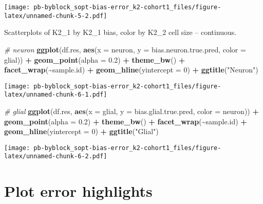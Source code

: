 \documentclass[
]{article}
\newenvironment{Shaded}{\begin{snugshade}}{\end{snugshade}}
\newcommand{\AttributeTok}[1]{\textcolor[rgb]{0.13,0.29,0.53}{#1}}
\newcommand{\CommentTok}[1]{\textcolor[rgb]{0.56,0.35,0.01}{\textit{#1}}}
\newcommand{\DecValTok}[1]{\textcolor[rgb]{0.00,0.00,0.81}{#1}}
\newcommand{\FloatTok}[1]{\textcolor[rgb]{0.00,0.00,0.81}{#1}}
\newcommand{\FunctionTok}[1]{\textcolor[rgb]{0.13,0.29,0.53}{\textbf{#1}}}
\newcommand{\NormalTok}[1]{#1}
\newcommand{\SpecialCharTok}[1]{\textcolor[rgb]{0.81,0.36,0.00}{\textbf{#1}}}
\newcommand{\StringTok}[1]{\textcolor[rgb]{0.31,0.60,0.02}{#1}}
\begin{document}
\texttt{[image: pb-byblock\_sopt-bias-error\_k2-cohort1\_files/figure-latex/unnamed-chunk-5-2.pdf]}

Scatterplots of K2\_1 by K2\_1 bias, color by K2\_2 cell size --
continuous.

\begin{Shaded}
\begin{Highlighting}[]
\CommentTok{\# neuron}
\FunctionTok{ggplot}\NormalTok{(df.res, }\FunctionTok{aes}\NormalTok{(}\AttributeTok{x =}\NormalTok{ neuron, }\AttributeTok{y =}\NormalTok{ bias.neuron.true.pred, }\AttributeTok{color =}\NormalTok{ glial)) }\SpecialCharTok{+} 
  \FunctionTok{geom\_point}\NormalTok{(}\AttributeTok{alpha =} \FloatTok{0.2}\NormalTok{) }\SpecialCharTok{+} \FunctionTok{theme\_bw}\NormalTok{() }\SpecialCharTok{+} \FunctionTok{facet\_wrap}\NormalTok{(}\SpecialCharTok{\textasciitilde{}}\NormalTok{sample.id) }\SpecialCharTok{+} \FunctionTok{geom\_hline}\NormalTok{(}\AttributeTok{yintercept =} \DecValTok{0}\NormalTok{) }\SpecialCharTok{+}
  \FunctionTok{ggtitle}\NormalTok{(}\StringTok{"Neuron"}\NormalTok{)}
\end{Highlighting}
\end{Shaded}

\texttt{[image: pb-byblock\_sopt-bias-error\_k2-cohort1\_files/figure-latex/unnamed-chunk-6-1.pdf]}

\begin{Shaded}
\begin{Highlighting}[]
\CommentTok{\# glial}
\FunctionTok{ggplot}\NormalTok{(df.res, }\FunctionTok{aes}\NormalTok{(}\AttributeTok{x =}\NormalTok{ glial, }\AttributeTok{y =}\NormalTok{ bias.glial.true.pred, }\AttributeTok{color =}\NormalTok{ neuron)) }\SpecialCharTok{+} 
  \FunctionTok{geom\_point}\NormalTok{(}\AttributeTok{alpha =} \FloatTok{0.2}\NormalTok{) }\SpecialCharTok{+} \FunctionTok{theme\_bw}\NormalTok{() }\SpecialCharTok{+} \FunctionTok{facet\_wrap}\NormalTok{(}\SpecialCharTok{\textasciitilde{}}\NormalTok{sample.id) }\SpecialCharTok{+} \FunctionTok{geom\_hline}\NormalTok{(}\AttributeTok{yintercept =} \DecValTok{0}\NormalTok{) }\SpecialCharTok{+}
  \FunctionTok{ggtitle}\NormalTok{(}\StringTok{"Glial"}\NormalTok{)}
\end{Highlighting}
\end{Shaded}

\texttt{[image: pb-byblock\_sopt-bias-error\_k2-cohort1\_files/figure-latex/unnamed-chunk-6-2.pdf]}

\hypertarget{plot-error-highlights}{%
\section{Plot error highlights}\label{plot-error-highlights}}
\end{document}
